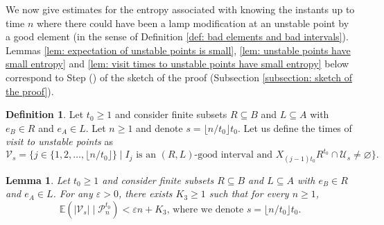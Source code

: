 \documentclass[reqno,oneside,11pt]{amsart}
\newcommand{\E}{\mathbb{E}}
\theoremstyle{plain}
\newtheorem{lem}[thm]{Lemma}
\theoremstyle{definition}
\newtheorem{defn}[thm]{Definition} %
\begin{document}
We now give estimates for the entropy associated with knowing the instants up to time $n$ where there could have been a lamp modification at an unstable point by a good element (in the sense of Definition \ref{def: bad elements and bad intervals}). Lemmas \ref{lem: expectation of unstable points is small}, \ref{lem: unstable points have small entropy} and \ref{lem: visit times to unstable points have small entropy} below correspond to Step () of the sketch of the proof (Subsection \ref{subsection: sketch of the proof}).

\begin{defn}\label{def: visits to unstable points} Let $t_0\ge 1$ and consider finite subsets $R\subseteq B$ and $L\subseteq A$ with $e_B\in R$ and $e_A\in L$. Let $n\ge 1$ and denote $s=\lfloor n/t_0\rfloor t_0$. Let us define the times of \emph{visit to unstable points} as
	\begin{equation*}
		\mathcal{V}_s=\{j\in\{1,2,\ldots,\lfloor n/t_0\rfloor\} \mid I_j\text{ is an }(R,L)\text{-good interval and }X_{(j-1)t_0}R^{t_0}\cap \mathcal{U}_s\neq \varnothing\}.
	\end{equation*}
\end{defn}
\begin{lem}\label{lem: not many visits in expectation} Let $t_0\ge 1$ and consider finite subsets $R\subseteq B$ and $L\subseteq A$ with $e_B\in R$ and $e_A\in L$. For any $\varepsilon>0$, there exists $K_3\ge 1$ such that for every $n\ge 1$,
	\begin{equation*}
		\E\left(|\mathcal{V}_s|\mid \mathcal{P}_n^{t_0}\right)<\varepsilon n +K_3 \text{, where we denote }s=\lfloor n/t_0\rfloor t_0.
	\end{equation*}
\end{lem}
\end{document}
